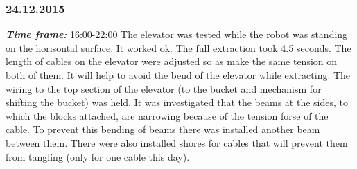 \subsubsection{24.12.2015}
\textit{\textbf{Time frame:}} 16:00-22:00 \newline
The elevator was tested while the robot was standing on the horisontal surface. It worked ok. The full extraction took 4.5 seconds.
The length of cables on the elevator were adjusted so as make the same tension on both of them. It will help to avoid the bend of the elevator while extracting.
The wiring to the top section of the elevator (to the bucket and mechanism for shifting the bucket) was held.
It was investigated that the beams at the sides, to which the blocks attached, are narrowing because of the tension forse of the cable. To prevent this bending of beams there was installed another beam between them.
There were also installed shores for cables that will prevent them from tangling (only for one cable this day).

